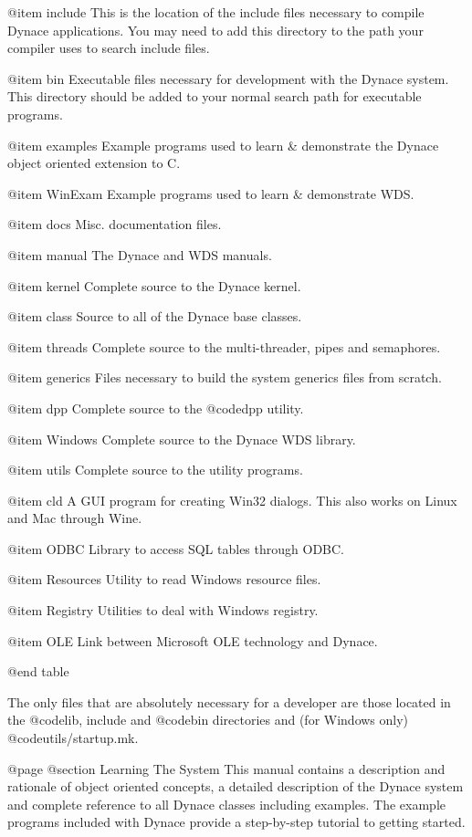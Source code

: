 @item include
This is the location of the include files necessary to compile Dynace
applications.  You may need to add this directory to the path your
compiler uses to search include files.

@item bin
Executable files necessary for development with the Dynace system.
This directory should be added to your normal search path for executable
programs.

@item examples
Example programs used to learn & demonstrate the Dynace object oriented
extension to C.

@item WinExam
Example programs used to learn & demonstrate WDS.

@item docs
Misc. documentation files.

@item manual
The Dynace and WDS manuals.

@item kernel
Complete source to the Dynace kernel.

@item class
Source to all of the Dynace base classes.

@item threads
Complete source to the multi-threader, pipes and semaphores.

@item generics
Files necessary to build the system generics files from scratch.

@item dpp
Complete source to the @code{dpp} utility.

@item Windows
Complete source to the Dynace WDS library.

@item utils
Complete source to the utility programs.

@item cld
A GUI program for creating Win32 dialogs.  This also works on Linux
and Mac through Wine.

@item ODBC
Library to access SQL tables through ODBC.

@item Resources
Utility to read Windows resource files.

@item Registry
Utilities to deal with Windows registry.

@item OLE
Link between Microsoft OLE technology and Dynace.

@end table



The only files that are absolutely necessary for a developer are those
located in the @code{lib, include} and @code{bin}
directories and (for Windows only) @code{utils/startup.mk}.




@page
@section Learning The System
This manual contains a description and rationale of object oriented
concepts, a detailed description of the Dynace system and complete
reference to all Dynace classes including examples.  The example programs
included with Dynace provide a step-by-step tutorial to getting started.

